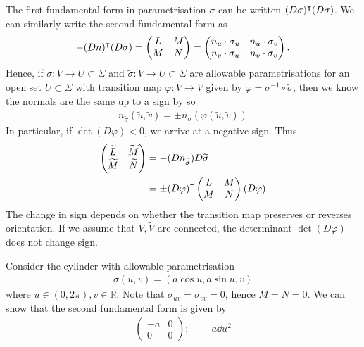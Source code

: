 \begin{remark}
	The first fundamental form in parametrisation $\sigma$ can be written $(D \sigma)^\intercal (D \sigma)$.
	We can similarly write the second fundamental form as
	\begin{align*}
		-(Dn)^\intercal (D\sigma) = \begin{pmatrix}
			L & M \\
			M & N
		\end{pmatrix} = \begin{pmatrix}
			n_u \cdot \sigma_u & n_u \cdot \sigma_v \\
			n_v \cdot \sigma_u & n_v \cdot \sigma_v
		\end{pmatrix}.
	\end{align*}
	Hence, if $\sigma \colon V \to U \subset \Sigma$ and $\widetilde \sigma \colon \widetilde V \to U \subset \Sigma$ are allowable parametrisations for an open set $U \subset \Sigma$ with transition map $\varphi \colon \widetilde V \to V$ given by $\varphi = \sigma^{-1} \circ \widetilde \sigma$, then we know the normals are the same up to a sign by  so
	\begin{align*}
		n_{\widetilde \sigma}(\widetilde u, \widetilde v) = \pm n_\sigma (\varphi(\widetilde u, \widetilde v))
	\end{align*} 
	In particular, if $\det (D \varphi) < 0$, we arrive at a negative sign.
	Thus
	\begin{align*}
		\begin{pmatrix}
			\widetilde L & \widetilde M \\
			\widetilde M & \widetilde N
		\end{pmatrix} &= -(Dn_{\widetilde \sigma}) D \widetilde{\sigma} \\
		&= \pm (D\varphi)^\intercal \begin{pmatrix}
			L & M \\
			M & N
		\end{pmatrix} (D\varphi)
	\end{align*}
	The change in sign depends on whether the transition map preserves or reverses orientation.
	If we assume that $V, \widetilde V$ are connected, the determinant $\det (D \varphi)$ does not change sign.
\end{remark}

\begin{example}
	Consider the cylinder with allowable parametrisation
	\begin{align*}
		\sigma(u,v) = (a \cos u, a \sin u, v)
	\end{align*}
	where $u \in (0,2\pi), v \in \mathbb R$.
	Note that $\sigma_{uv} = \sigma_{vv} = 0$, hence $M = N = 0$.
	We can show that the second fundamental form is given by
	\begin{align*}
		\begin{pmatrix}
			-a & 0 \\
			0  & 0
		\end{pmatrix};\quad -a \dd{u}^2
	\end{align*}
\end{example}

